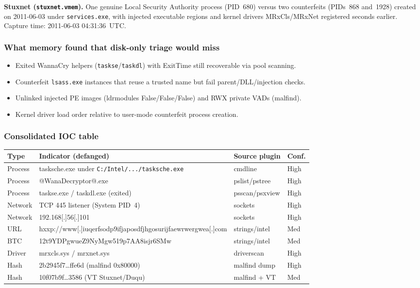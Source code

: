 \documentclass[11pt,letterpaper]{article}
\begin{document}
\textbf{Stuxnet (\texttt{stuxnet.vmem}).}
 One genuine Local Security Authority process (PID~680) versus two counterfeits
(PIDs~868 and~1928) created on 2011-06-03 under \texttt{services.exe}, with injected executable regions and
kernel drivers MRxCls/MRxNet registered seconds earlier. Capture time: 2011-06-03 04:31:36~UTC.

\subsubsection*{What memory found that disk-only triage would miss}
\begin{itemize}
  \item Exited WannaCry helpers (\texttt{taskse}/\texttt{taskdl}) with ExitTime still recoverable via pool scanning.
  \item Counterfeit \texttt{lsass.exe} instances that reuse a trusted name but fail parent/DLL/injection checks.
  \item Unlinked injected PE images (ldrmodules False/False/False) and RWX private VADs (malfind).
  \item Kernel driver load order relative to user-mode counterfeit process creation.
\end{itemize}

\subsubsection*{Consolidated IOC table}
{\small
\begin{tabularx}{\textwidth}{@{}P{0.75in} Y P{0.95in} P{0.7in}@{}}
\toprule
Type & Indicator (defanged) & Source plugin & Conf. \\
\midrule
Process & tasksche.exe under \texttt{C:/Intel/.../tasksche.exe} & cmdline & High \\
Process & @WanaDecryptor@.exe & pslist/pstree & High \\
Process & taskse.exe / taskdl.exe (exited) & psscan/psxview & High \\
Network & TCP 445 listener (System PID~4) & sockets & High \\
Network & 192.168[.]56[.]101 & sockets & High \\
URL & hxxp://www[.]iuqerfsodp9ifjaposdfjhgosurijfaewrwergwea[.]com & strings/intel & Med \\
BTC & 12t9YDPgwueZ9NyMgw519p7AA8isjr6SMw & strings/intel & Med \\
Driver & mrxcls.sys / mrxnet.sys & driverscan & High \\
Hash & 2b2945f7\ldots ffe6d (malfind 0x80000) & malfind dump & High \\
Hash & 10f07b9f\ldots 3586 (VT Stuxnet/Duqu) & malfind + VT & Med \\
\bottomrule
\end{tabularx}}
\end{document}
